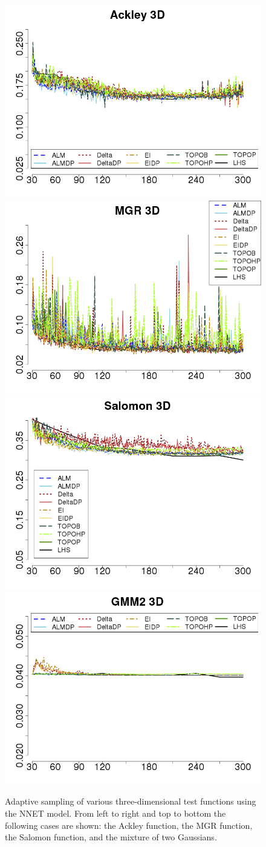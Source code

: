 \begin{figure}[t]
\begin{center}
\includegraphics[width=0.48\linewidth]{figs/chap5/nnet_Ackley_td=30}\label{fig:ackley3D_nnet}
\includegraphics[width=0.48\linewidth]{figs/chap5/nnet_MGR_td=30}\label{fig:mgr3D_nnet}
\includegraphics[width=0.48\linewidth]{figs/chap5/nnet_Salomon_td=30}\label{fig:salomon3D_nnet}
\includegraphics[width=0.48\linewidth]{figs/chap5/nnet_GMM2_3D_td=30}\label{fig:gmm23D_nnet}
\caption{Adaptive sampling of various three-dimensional test functions using the
  NNET model. From left to right and top to bottom the following cases are shown: the Ackley function, the MGR function, the Salomon function, and the mixture of two Gaussians.}
  \label{fig:nnet_3D}
\end{center}
\end{figure}


